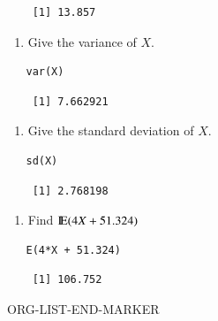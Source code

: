 \documentclass[captions=tableheading]{scrbook}
\begin{document}
\begin{xca}
\begin{verbatim}
    [1] 13.857
\end{verbatim}

\begin{enumerate}
\item Give the variance of \(X\).
\end{enumerate}

\begin{verbatim}
   var(X)
\end{verbatim}

\begin{verbatim}
    [1] 7.662921
\end{verbatim}

\begin{enumerate}
\item Give the standard deviation of \(X\).
\end{enumerate}

\begin{verbatim}
   sd(X)
\end{verbatim}

\begin{verbatim}
    [1] 2.768198
\end{verbatim}

\begin{enumerate}
\item Find \(\mathrm{I\hspace{-1.5pt}E}(4X+51.324)\)
\end{enumerate}

\begin{verbatim}
   E(4*X + 51.324)
\end{verbatim}

\begin{verbatim}
    [1] 106.752
\end{verbatim}

ORG-LIST-END-MARKER
\end{xca}
\end{document}

